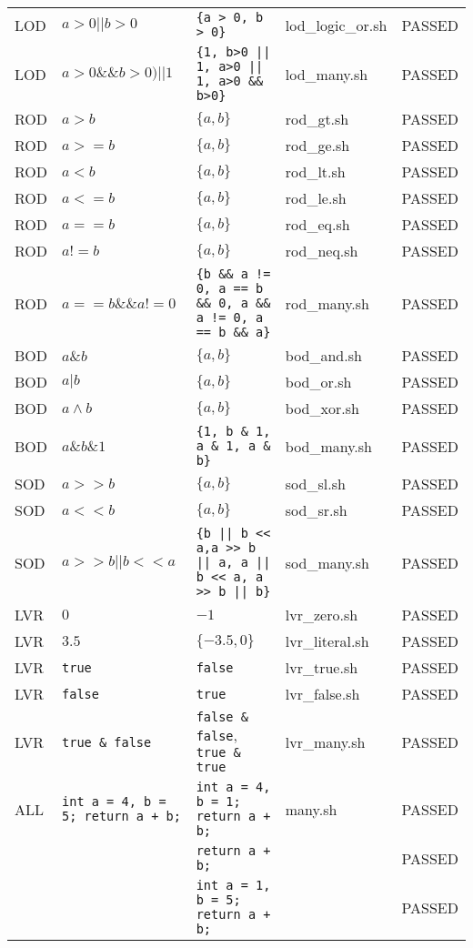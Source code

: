 \begin{longtable}{|p{1cm}|p{3cm}|p{5.5cm}|p{2.5cm}|p{1.5cm}|}
LOD	&	$a > 0 || b > 0$	&	\texttt{\{a > 0, b > 0\}}	&	lod\_logic\_or.sh  & PASSED\\
LOD	&	$a > 0 \&\& b > 0) || 1$	&	\texttt{\{1, b>0 || 1, a>0 || 1, a>0 \&\& b>0\}}	&	lod\_many.sh  & PASSED\\
ROD	&	$a>b$	&	$\{a, b\}$	&	rod\_gt.sh  & PASSED\\
ROD	&	$a>=b$	&	$\{a, b\}$	&	rod\_ge.sh  & PASSED\\
ROD	&	$a<b$	&	$\{a, b\}$	&	rod\_lt.sh  & PASSED\\
ROD	&	$a<=b$	&	$\{a, b\}$	&	rod\_le.sh  & PASSED\\
ROD	&	$a==b$	&	$\{a, b\}$	&	rod\_eq.sh  & PASSED\\
ROD	&	$a!=b$	&	$\{a, b\}$	&	rod\_neq.sh  & PASSED\\
ROD	&	$a == b \&\& a != 0$	&	\texttt{\{b \&\& a != 0, a == b \&\&  0, a  \&\& a != 0, a == b \&\& a\}}	&	rod\_many.sh  & PASSED\\
BOD	&	$a\&b$	&	$\{a, b\}$	&	bod\_and.sh  & PASSED\\
BOD	&	$a|b$	&	$\{a, b\}$	&	bod\_or.sh  & PASSED\\
BOD	&	$a \land b$	&	$\{a, b\}$	&	bod\_xor.sh  & PASSED\\
BOD	&	$a \& b \& 1$	&	\texttt{\{1, b \& 1, a \& 1, a \& b\}}	&	bod\_many.sh  & PASSED\\
SOD	&	$a>>b$	&	$\{a, b\}$	&	sod\_sl.sh  & PASSED\\
SOD	&	$a<<b$	&	$\{a, b\}$	&	sod\_sr.sh  & PASSED\\
SOD	&	$a >> b || b << a$	&	\texttt{\{b || b << a,a >> b || a, a || b << a, a >> b || b\}}	&	sod\_many.sh  & PASSED\\
LVR	&	$0$	&	$-1$	&	lvr\_zero.sh  & PASSED\\
LVR	&	$3.5$	&	$\{-3.5, 0\}$	&	lvr\_literal.sh  & PASSED\\
LVR	&	\texttt{true}	&	\texttt{false}	&	lvr\_true.sh  & PASSED\\
LVR	&	\texttt{false}	&	\texttt{true}	&	lvr\_false.sh  & PASSED\\
LVR	&	\texttt{true \& false}	&	\texttt{false \& false}, \texttt{true \& true}	&	lvr\_many.sh  & PASSED\\
ALL	&	\texttt{int a = 4, b = 5; return a + b;}	&	\texttt{int a = 4, b = 1; return a + b;}	&	many.sh  & PASSED\\
& & \texttt{return a + b;} &  & PASSED\\
& & \texttt{int a = 1, b = 5; return a + b;} &  & PASSED\\

\end{longtable}
